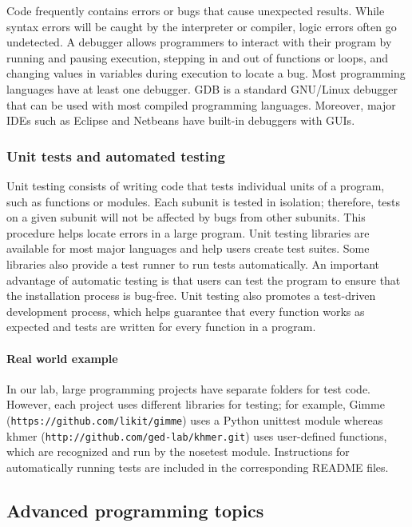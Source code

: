 \documentclass[ChapterTOCs,krantz2]{krantz} %
\begin{document}
Code frequently contains errors or bugs that cause unexpected results.
While syntax errors will be caught by the interpreter or compiler, 
logic errors often go undetected.
A debugger allows programmers to interact with their program by
running and pausing execution, stepping in and out of functions or loops, and changing values
in variables during execution to locate a bug.
Most programming languages have at least one debugger.
GDB is a standard GNU/Linux debugger that can be used with most
compiled programming languages.
Moreover, major IDEs such as Eclipse and Netbeans have built-in debuggers
with GUIs. 

\subsubsection{Unit tests and automated testing}

Unit testing consists of writing
code that tests individual units of a program, such as functions or modules.
Each subunit is tested in isolation; therefore, tests 
on a given subunit will not be affected by bugs from other subunits. This
procedure helps locate errors in a large program. 
Unit testing libraries are available for most major languages
and help users create test
suites. Some libraries also
provide a test runner to run tests automatically. An important
advantage of automatic testing is that users can
test the program to ensure that the installation process is bug-free.  Unit
testing also promotes a test-driven development process, which 
helps guarantee that
every function works as expected and tests are written for every function in a
program.

\paragraph{Real world example}

In our lab,
large programming projects have separate folders for test code. However, each project uses
different libraries for testing; for example, Gimme
(\texttt{https://github.com/likit/gimme}) uses a Python unittest module whereas khmer
(\texttt{http://github.com/ged-lab/khmer.git}) uses user-defined functions, which are
recognized and run by the nosetest module. Instructions for automatically
running tests are included in the corresponding README
files.

\subsection{Advanced programming topics}
\end{document}
